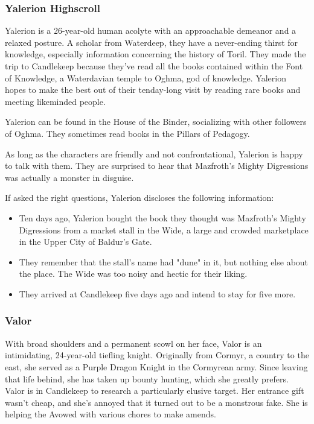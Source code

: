 \documentclass[10pt,a4paper,twoside,bg=print,twocolumn,openany,nodeprecatedcode]{dndbook}
\begin{document}
\subsubsection{Yalerion Highscroll}
Yalerion is a 26-year-old human acolyte with an approachable demeanor and a relaxed posture. A scholar from Waterdeep, they have a never-ending thirst for knowledge, especially information concerning the history of Toril. They made the trip to Candlekeep because they've read all the books contained within the Font of Knowledge, a Waterdavian temple to Oghma, god of knowledge. Yalerion hopes to make the best out of their tenday-long visit by reading rare books and meeting likeminded people.

Yalerion can be found in the House of the Binder, socializing with other followers of Oghma. They sometimes read books in the Pillars of Pedagogy.

As long as the characters are friendly and not confrontational, Yalerion is happy to talk with them. They are surprised to hear that Mazfroth's Mighty Digressions was actually a monster in disguise.

If asked the right questions, Yalerion discloses the following information:


\begin{itemize}
\item Ten days ago, Yalerion bought the book they thought was Mazfroth's Mighty Digressions from a market stall in the Wide, a large and crowded marketplace in the Upper City of Baldur's Gate.
\item They remember that the stall's name had "dune" in it, but nothing else about the place. The Wide was too noisy and hectic for their liking.
\item They arrived at Candlekeep five days ago and intend to stay for five more.
\end{itemize}

\subsubsection{Valor}
With broad shoulders and a permanent scowl on her face, Valor is an intimidating, 24-year-old tiefling knight. Originally from Cormyr, a country to the east, she served as a Purple Dragon Knight in the Cormyrean army. Since leaving that life behind, she has taken up bounty hunting, which she greatly prefers. Valor is in Candlekeep to research a particularly elusive target. Her entrance gift wasn't cheap, and she's annoyed that it turned out to be a monstrous fake. She is helping the Avowed with various chores to make amends.
\end{document}
